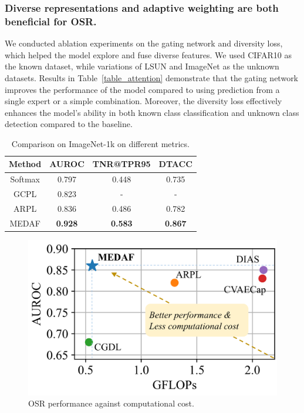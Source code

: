 \documentclass[letterpaper]{article} %
\begin{document}
\subsubsection{Diverse representations and adaptive weighting are both beneficial for OSR.} We conducted ablation experiments on the gating network and diversity loss, which helped the model explore and fuse diverse features. We used CIFAR10 as the known dataset, while variations of LSUN and ImageNet as the unknown datasets. Results in Table~\ref{table_attention} demonstrate that the gating network improves the performance of the model compared to using prediction from a single expert or a simple combination. Moreover, the diversity loss effectively enhances the model’s ability in both known class classification and unknown class detection compared to the baseline.
\begin{table}[t]
\small
\centering
\begin{tabular}{cccc}
\hline
Method & AUROC & TNR@TPR95 & DTACC \\ \hline
Softmax & 0.797 & 0.448 & 0.735 \\
GCPL & 0.823 & - & - \\
ARPL & 0.836 & 0.486 & 0.782 \\  \hline
MEDAF & \textbf{0.928} & \textbf{0.583} & \textbf{0.867} \\\hline
\end{tabular}
\caption{Comparison on ImageNet-1k on different metrics.}
\label{table_imgn1k}
\end{table}

\begin{figure}[t]
  \begin{center}
    \includegraphics[width=0.75\linewidth]{Figs/Figure_gflops.pdf}
    \caption{OSR performance against computational cost.}
    \label{fig:Fig_gflops}
    \end{center}
\end{figure}
\end{document}
